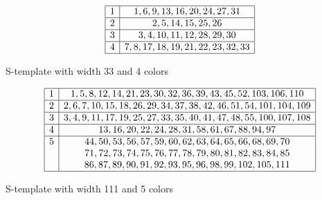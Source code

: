 \documentclass[final,onefignum,onetabnum]{siamart190516}
\begin{document}
\vspace{-1.5ex}

\begin{table}[H]
\renewcommand{\arraystretch}{1.1}
\begin{small}
\[
\begin{array}{|*{2}{c|}}
	\hline
	1 & 1, 6, 9, 13, 16, 20, 24, 27, 31 \\
	\hline
	2 & 2, 5, 14, 15, 25, 26 \\
	\hline
	3 & 3, 4, 10, 11, 12, 28, 29, 30 \\
	\hline
	4 & 7, 8, 17, 18, 19, 21, 22, 23, 32, 33 \\
	\hline
\end{array}
\]
\end{small}
\vspace{-3ex}
\caption{S-template with width 33 and 4 colors}
\vspace{-2ex}
\end{table}

\begin{table}[H]
\renewcommand{\arraystretch}{1.1}
\begin{small}
\[
\begin{array}{|*{2}{c|}}
	\hline
	1 & 1, 5, 8, 12, 14 ,21, 23, 30, 32, 36, 39, 43, 45, 52, 103, 106, 110 \\
	\hline
	2 & 2, 6, 7, 10, 15, 18, 26, 29, 34, 37, 38, 42, 46, 51, 54, 101, 104, 109 \\
	\hline
	3 & 3, 4, 9, 11, 17, 19, 25, 27, 33, 35, 40, 41, 47, 48, 55, 100, 107, 108 \\
	\hline
	4 & 13, 16, 20, 22, 24, 28, 31, 58, 61, 67, 88, 94, 97 \\
	\hline
	5 & 44, 50, 53, 56, 57, 59, 60, 62, 63, 64, 65, 66, 68, 69, 70\\
	& 71, 72, 73, 74, 75, 76, 77, 78, 79, 80, 81, 82, 83, 84, 85\\
	& 86, 87, 89, 90, 91, 92, 93, 95, 96, 98, 99, 102, 105, 111 \\
	\hline
\end{array}
\]
\end{small}
\vspace{-3ex}
\caption{S-template with width 111 and 5 colors}
\vspace{-2ex}
\end{table}
\end{document}
